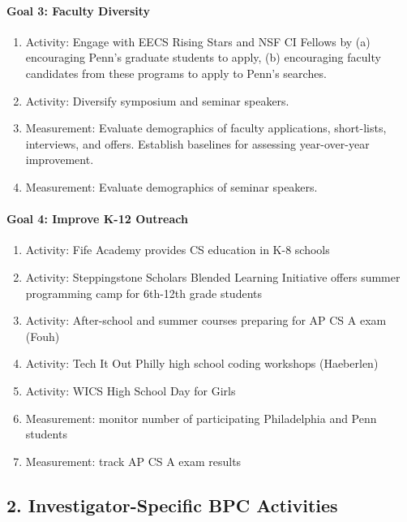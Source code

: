 \paragraph*{Goal 3: Faculty Diversity}

\begin{enumerate}[itemsep=-1mm]
\item Activity: Engage with EECS Rising Stars and NSF CI Fellows by (a) encouraging Penn’s graduate students to apply, (b) encouraging faculty candidates from these programs to apply to Penn's searches.
\item Activity: Diversify symposium and seminar speakers.
\item Measurement: Evaluate demographics of faculty applications, short-lists, interviews, and offers. Establish baselines for assessing year-over-year improvement.
\item Measurement: Evaluate demographics of seminar speakers.
\end{enumerate}

\paragraph*{Goal 4: Improve K-12 Outreach}

\begin{enumerate}[itemsep=-1mm]
\item Activity: Fife Academy provides CS education in K-8 schools
\item Activity: Steppingstone Scholars Blended Learning Initiative offers summer programming camp for 6th-12th grade students
\item Activity: After-school and summer courses preparing for AP CS A exam (Fouh)
\item Activity: Tech It Out Philly high school coding workshops (Haeberlen)
\item Activity: WICS High School Day for Girls
\item Measurement: monitor number of participating Philadelphia and Penn students
\item Measurement: track AP CS A exam results
\end{enumerate}

\subsection*{2. Investigator-Specific BPC Activities}


